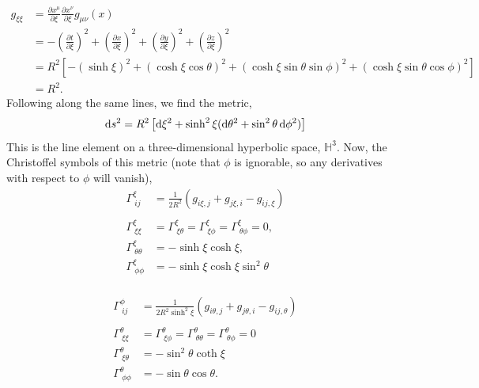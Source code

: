 \begin{equation}
    \begin{split}
        g_{\xi\xi} &= \frac{\partial x^{\mu}}{\partial\xi}\frac{\partial x^{\nu}}{\partial \xi}g_{\mu\nu}(x) \\
        &= -\left(\frac{\partial t}{\partial\xi}\right)^2 + \left(\frac{\partial x}{\partial\xi}\right)^2 +  
        \left(\frac{\partial y}{\partial\xi}\right)^2 +   
        \left(\frac{\partial z}{\partial\xi}\right)^2\\
        &= R^2\left[-(\sinh\xi)^2 + (\cosh\xi\cos\theta)^2+(\cosh\xi\sin\theta\sin\phi)^2 + (\cosh\xi\sin\theta\cos\phi)^2\right]\\
        &=R^2.
    \end{split}
\end{equation}
Following along the same lines, we find the metric, 
\begin{equation}
    \operatorname{d}\!{s}^2 = R^2\left[\operatorname{d}\!{\xi}^2 + \sinh^2\xi(\operatorname{d}\!{\theta}^2 + \sin^2\theta\operatorname{d}\!{\phi}^2)\right]
\end{equation}
This is the line element on a three-dimensional hyperbolic space, $\mathbb{H}^3$. Now, the Christoffel symbols of this metric (note that $\phi$ is ignorable, so any derivatives with respect to $\phi$ will vanish), 
\begin{equation}
    \begin{split}
  \Gamma^{\xi}_{\ ij} &= \frac{1}{2R^2}\left(g_{i\xi,j} + g_{j\xi,i} - g_{ij,\xi}\right)\\
  \\
    \Gamma^{\xi}_{\ \xi\xi} &= \Gamma^{\xi}_{\ \xi\theta} = \Gamma^{\xi}_{\ \xi\phi} = \Gamma^{\xi}_{\ \theta\phi} = 0,\\
    \Gamma^{\xi}_{\ \theta\theta} &= -\sinh\xi\cosh\xi,\\
    \Gamma^{\xi}_{\ \phi\phi} &= -\sinh\xi\cosh\xi\sin^2\theta\\
\end{split}
  \end{equation}
  
\begin{equation}
\begin{split}
\Gamma^{\phi}_{\ ij} &= \frac{1}{2R^2\sinh^2\xi}\left(g_{i\theta,j} + g_{j\theta,i} - g_{ij,\theta}\right)\\
\\
    \Gamma^{\theta}_{\ \xi\xi} &= \Gamma^{\theta}_{\ \xi\phi} = \Gamma^{\theta}_{\ \theta\theta} = \Gamma^{\theta}_{\ \theta\phi}=0\\
    \Gamma^{\theta}_{\ \xi\theta} &= -\sin^2\theta\coth\xi\\
    \Gamma^{\theta}_{\ \phi\phi} &= -\sin\theta\cos\theta.
\end{split}
\end{equation}


